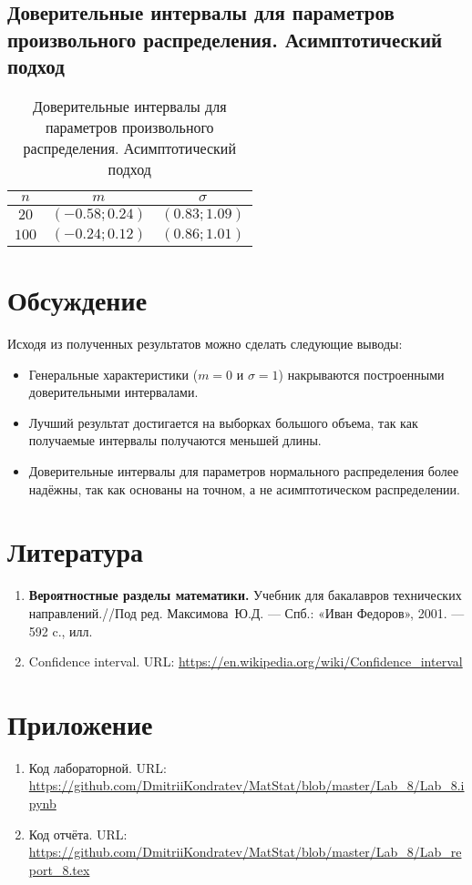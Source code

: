 \documentclass[12pt,a4paper]{article}
\begin{document}
		\subsection{Доверительные интервалы для параметров произвольного распределения. Асимптотический подход}
		\begin{table}[H]
			\begin{center}				
				\begin{tabular}{|c|c|c|}
					\hline
					$n$ & $m$ & $\sigma$\\
					\hline
					$20$ & $(-0.58; 0.24)$ & $(0.83; 1.09)$\\ 
					\hline
					$100$ & $(-0.24; 0.12)$ & $(0.86; 1.01)$\\
					\hline
				\end{tabular}
			\end{center}
			\caption{Доверительные интервалы для параметров произвольного распределения. Асимптотический подход}
		\end{table}
	
	\section{Обсуждение}
	Исходя из полученных результатов можно сделать следующие выводы:
	\begin{itemize}
		\item Генеральные характеристики ($m = 0$ и $\sigma = 1$) накрываются построенными доверительными интервалами.
		
		\item Лучший результат достигается на выборках большого объема, так как получаемые интервалы получаются меньшей длины.
		
		\item Доверительные интервалы для параметров нормального распределения более надёжны, так как основаны на точном, а не асимптотическом распределении.
	\end{itemize}
	
	\section{Литература}
	\begin{enumerate}
		\item \label{Book_1} \textbf{Вероятностные разделы математики.} Учебник для бакалавров технических направлений.//Под ред. Максимова~Ю.Д. --- Спб.: «Иван Федоров», 2001. --- 592 c., илл.
		
		\item Confidence interval. URL: \url{https://en.wikipedia.org/wiki/Confidence_interval}
	\end{enumerate}

	\section{Приложение}
	\begin{enumerate}
		\item Код лабораторной. URL: \url{https://github.com/DmitriiKondratev/MatStat/blob/master/Lab_8/Lab_8.ipynb}
		
		\item Код отчёта. URL: \url{https://github.com/DmitriiKondratev/MatStat/blob/master/Lab_8/Lab_report_8.tex}
		
	\end{enumerate}
\end{document}
